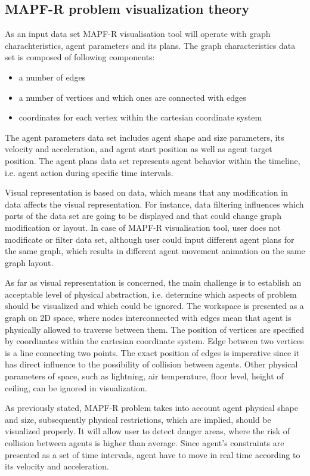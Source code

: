 \documentclass[thesis=B,english]{FITthesis}[2019/12/23]
\begin{document}
\subsection{MAPF-R problem visualization theory}

As an input data set MAPF-R visualisation tool will operate with graph charachteristics, agent parameters and its plans. The graph characteristics data set is composed of following components: 
\begin{itemize}
	\item a number of edges
	\item a number of vertices and which ones are connected with edges
	\item coordinates for each vertex within the cartesian coordinate system
\end{itemize}

The agent parameters data set includes agent shape and size parameters, its velocity and acceleration, and agent start position as well as agent target position. The agent plans data set represents agent behavior within the timeline, i.e. agent action during specific time intervals.     

Visual representation is based on data, which means that any modification in data affects the visual representation. For instance, data filtering influences which parts of the data set are going to be displayed and that could change graph modification or layout. In case of MAPF-R visualisation tool, user does not modificate or filter data set, although user could input different agent plans for the same graph, which results in different agent movement animation on the same graph layout. 


As far as visual representation is concerned, the main challenge is to establish an acceptable level of physical abstraction, i.e. determine which aspects of problem should be visualized and which could be ignored. The workspace is presented as a graph on 2D space, where nodes interconnected with edges mean that agent is physically allowed to traverse between them. The position of vertices are specified by coordinates within the cartesian coordinate system. Edge between two vertices is a line connecting two points. The exact position of edges is imperative since it has direct influence to the possibility of collision between agents. Other physical parameters of space, such as lightning, air temperature, floor level, height of ceiling, can be ignored in visualization.

As previously stated, MAPF-R problem takes into account agent physical shape and size, subsequently physical restrictions, which are implied, should be visualized properly. It will allow user to detect danger areas, where the risk of collision between agents is higher than average. Since agent's constraints are presented as a set of time intervals, agent have to move in real time according to its velocity and acceleration.
\end{document}

